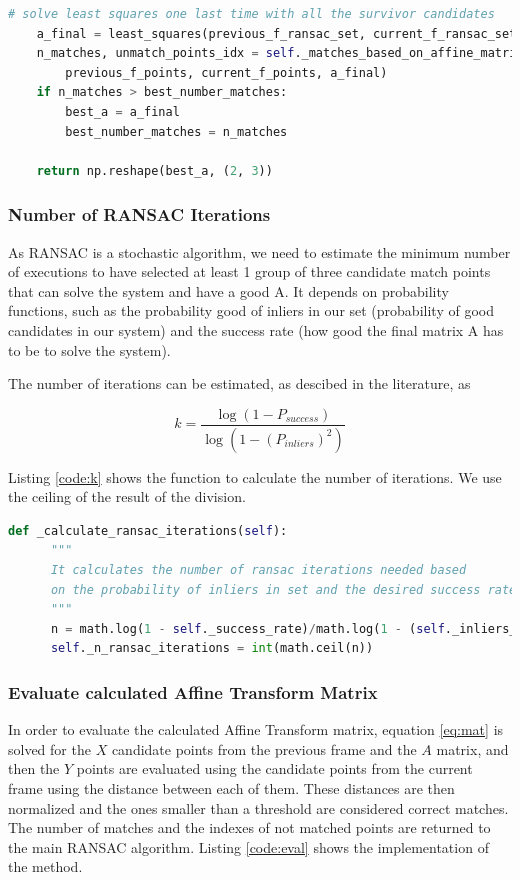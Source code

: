 \documentclass[]{IEEEtran}
\begin{document}
\begin{lstlisting}[language=Python, caption={RANSAC to estimate Affine Transformation Matrix}, label={code:ransac}]
    # solve least squares one last time with all the survivor candidates
    a_final = least_squares(previous_f_ransac_set, current_f_ransac_set)
    n_matches, unmatch_points_idx = self._matches_based_on_affine_matrix(
        previous_f_points, current_f_points, a_final)
    if n_matches > best_number_matches:
        best_a = a_final
        best_number_matches = n_matches

    return np.reshape(best_a, (2, 3))
\end{lstlisting}

\subsubsection{Number of RANSAC Iterations}
  As RANSAC is a stochastic algorithm, we need to estimate the minimum number of executions to have selected at least 1 group of three candidate match points that can solve the system and have a good A. It depends on probability functions, such as the probability good of inliers in our set (probability of good candidates in our system) and the success rate (how good the final matrix A has to be to solve the system). 

  The number of iterations can be estimated, as descibed in the literature, as

  \begin{equation}
    k = \dfrac{\log (1 - P_{success})}{\log (1 - (P_{inliers})^{2})}
  \end{equation}

  Listing \ref{code:k} shows the function to calculate the number of iterations. We use the ceiling of the result of the division.

  \begin{lstlisting}[language=Python, caption={Calculate number of RANSAC iterations}, label={code:k}]
    def _calculate_ransac_iterations(self):
      """
      It calculates the number of ransac iterations needed based
      on the probability of inliers in set and the desired success rate
      """
      n = math.log(1 - self._success_rate)/math.log(1 - (self._inliers_rate)**2)
      self._n_ransac_iterations = int(math.ceil(n))
  \end{lstlisting}

\subsubsection{Evaluate calculated Affine Transform Matrix}
In order to evaluate the calculated Affine Transform matrix, equation \ref{eq:mat} is solved for the $X$ candidate points from the previous frame and the $A$ matrix, and then the $Y$ points are evaluated using the candidate points from the current frame using the distance between each of them. These distances are then normalized and the ones smaller than a threshold are considered correct matches. The number of matches and the indexes of not matched points are returned to the main RANSAC algorithm. Listing \ref{code:eval} shows the implementation of the method. 
\end{document}
